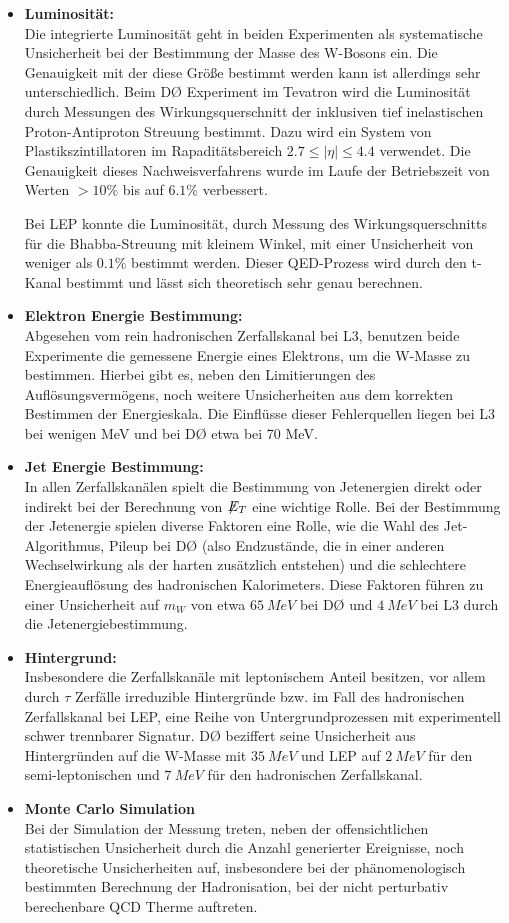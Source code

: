 \documentclass[a4paper,12pt]{article}
\newcommand{\met}{\ensuremath{\not\mathrel{E}}_T}
\begin{document}
\begin{itemize}
	\item \textbf{Luminosität:} \\
	Die integrierte Luminosität geht in beiden Experimenten als systematische Unsicherheit bei der Bestimmung der Masse des W-Bosons ein.
	Die Genauigkeit mit der diese Größe bestimmt werden kann ist allerdings sehr unterschiedlich.
	Beim DØ Experiment im Tevatron wird die Luminosität
	durch Messungen des Wirkungsquerschnitt der inklusiven tief inelastischen Proton-Antiproton Streuung bestimmt\cite{2011arXiv1106.5182P}. Dazu
	wird ein System von Plastikszintillatoren im Rapaditätsbereich $2.7 \leq |\eta| \leq 4.4$ verwendet. Die Genauigkeit dieses Nachweisverfahrens wurde
	im Laufe der Betriebszeit von Werten $ > 10\%$ bis auf $ 6.1\%$ verbessert.

	Bei LEP konnte die Luminosität, durch Messung des
	Wirkungsquerschnitts für die Bhabba-Streuung mit kleinem Winkel, mit einer Unsicherheit von weniger	als $0.1\%$ bestimmt werden. Dieser QED-Prozess
	wird durch den t-Kanal bestimmt und lässt sich theoretisch sehr genau berechnen.
	\item \textbf{Elektron Energie Bestimmung:} \\
	Abgesehen vom rein hadronischen Zerfallskanal bei L3, benutzen beide Experimente die gemessene Energie eines Elektrons, um die W-Masse zu bestimmen.
	Hierbei gibt es, neben den Limitierungen des Auflösungsvermögens, noch weitere Unsicherheiten aus dem korrekten Bestimmen der Energieskala.
	Die Einflüsse dieser Fehlerquellen liegen bei L3 bei wenigen MeV und bei DØ etwa bei 70 MeV.
	\item \textbf{Jet Energie Bestimmung:} \\
	In allen Zerfallskanälen spielt die Bestimmung von Jetenergien direkt oder indirekt bei der Berechnung von $\met$ eine wichtige Rolle. Bei der
	Bestimmung der Jetenergie spielen diverse Faktoren eine Rolle, wie die Wahl des Jet-Algorithmus, Pileup bei DØ (also Endzustände, die in einer anderen Wechselwirkung
	als der harten zusätzlich entstehen) und die schlechtere Energieauflösung des hadronischen Kalorimeters. Diese Faktoren führen zu einer Unsicherheit auf $m_{W}$ von
	etwa $\SI{65}{MeV}$ bei DØ und $\SI{4}{MeV}$ bei L3 durch die Jetenergiebestimmung.
	\item \textbf{Hintergrund:}\\
	Insbesondere die Zerfallskanäle mit leptonischem Anteil besitzen, vor allem durch $\tau$ Zerfälle irreduzible Hintergründe bzw. im Fall
	des hadronischen Zerfallskanal bei LEP, eine Reihe von Untergrundprozessen mit experimentell schwer trennbarer Signatur. DØ beziffert seine
	Unsicherheit aus Hintergründen auf die W-Masse mit $\SI{35}{MeV}$ und LEP auf $\SI{2}{MeV}$ für den semi-leptonischen und $\SI{7}{MeV}$
	für den hadronischen Zerfallskanal.
	\item \textbf{Monte Carlo Simulation}\\
	Bei der Simulation der Messung treten, neben der offensichtlichen statistischen Unsicherheit durch die Anzahl generierter Ereignisse, noch
	theoretische Unsicherheiten auf, insbesondere bei der phänomenologisch bestimmten Berechnung der Hadronisation, bei der nicht perturbativ berechenbare
	QCD Therme auftreten.
\end{itemize}
\end{document}
